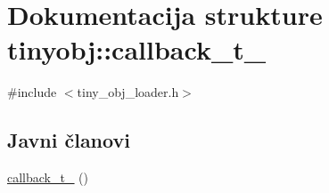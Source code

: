 \hypertarget{structtinyobj_1_1callback__t__}{}\section{Dokumentacija strukture tinyobj\+:\+:callback\+\_\+t\+\_\+}
\label{structtinyobj_1_1callback__t__}


{\ttfamily \#include $<$tiny\+\_\+obj\+\_\+loader.\+h$>$}

\subsection*{Javni članovi}
\begin{DoxyCompactItemize}
\item 
\hyperlink{structtinyobj_1_1callback__t___a4ed08b371281cfcf1ae169cc556bb483}{callback\+\_\+t\+\_\+} ()
\end{DoxyCompactItemize}
